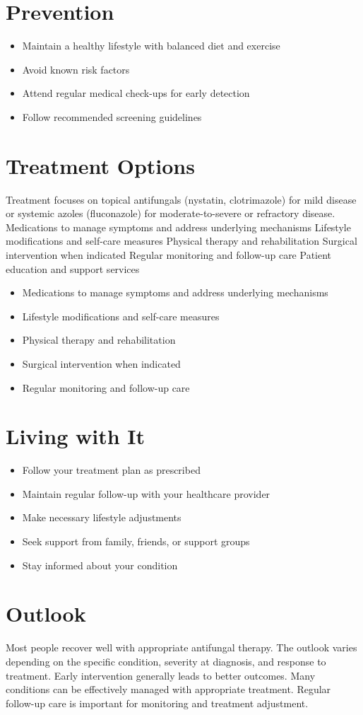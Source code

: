 \section{Prevention}
\begin{itemize}[noitemsep]
  \item Maintain a healthy lifestyle with balanced diet and exercise
  \item Avoid known risk factors
  \item Attend regular medical check-ups for early detection
  \item Follow recommended screening guidelines
\end{itemize}
\section{Treatment Options}
Treatment focuses on topical antifungals (nystatin, clotrimazole) for mild disease or systemic azoles (fluconazole) for moderate-to-severe or refractory disease. Medications to manage symptoms and address underlying mechanisms Lifestyle modifications and self-care measures Physical therapy and rehabilitation Surgical intervention when indicated Regular monitoring and follow-up care Patient education and support services

\begin{itemize}[noitemsep]
  \item Medications to manage symptoms and address underlying mechanisms
  \item Lifestyle modifications and self-care measures
  \item Physical therapy and rehabilitation
  \item Surgical intervention when indicated
  \item Regular monitoring and follow-up care
\end{itemize}
\section{Living with It}
\begin{itemize}[noitemsep]
  \item Follow your treatment plan as prescribed
  \item Maintain regular follow-up with your healthcare provider
  \item Make necessary lifestyle adjustments
  \item Seek support from family, friends, or support groups
  \item Stay informed about your condition
\end{itemize}
\section{Outlook}
Most people recover well with appropriate antifungal therapy. The outlook varies depending on the specific condition, severity at diagnosis, and response to treatment. Early intervention generally leads to better outcomes. Many conditions can be effectively managed with appropriate treatment. Regular follow-up care is important for monitoring and treatment adjustment.
